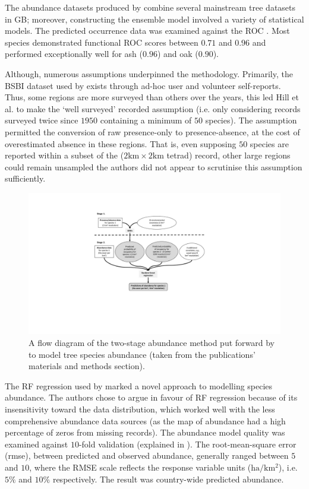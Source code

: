 The abundance datasets produced by \cite{hill.data} combine several mainstream tree datasets in GB; moreover, 
constructing the ensemble model involved a variety of statistical models.
The predicted occurrence data was examined against the ROC \cite{jimenez2012insights}.
Most species demonstrated functional ROC scores between $0.71$ and $0.96$ and performed exceptionally
well for ash ($0.96$) and oak ($0.90$).  

Although, numerous assumptions underpinned the methodology.
Primarily, the BSBI dataset used by \cite{hill.data} exists through ad-hoc user and volunteer self-reports.
Thus, some regions are more surveyed than others over the years, this led Hill et al. to make the 
`well surveyed' recorded assumption (i.e. only considering records surveyed twice since $1950$ containing a minimum of $50$ species).
The assumption permitted the conversion of raw presence-only to presence-absence, 
at the cost of overestimated absence in these regions. That is, even supposing $50$ species
are reported within a subset of the ($\mathrm{2km \times 2km}$ tetrad) record, other large regions could remain unsampled\textemdash
the authors did not appear to scrutinise this assumption sufficiently.

\begin{figure}
    \centering
    \includegraphics[scale=0.55]{chapter2/figures/hill-method-fig.pdf}
    \caption{A flow diagram of the two-stage abundance method put forward by \cite{hill.data} to model tree species abundance  
    (taken from the publications' materials and methods section).}
    \label{fig:hill-method}
\end{figure}

The RF regression used by \cite{hill.data} marked a novel approach to modelling species abundance.
The authors chose to argue in favour of RF regression because of its insensitivity toward the data distribution,
which worked well with the less comprehensive abundance data sources (as the map of abundance had a high percentage of zeros from missing records).
The abundance model quality was examined against $10$-fold validation (explained in \cite{refaeilzadeh2009cross}).
The root-mean-square error (\acrshort{rmse}), between predicted and observed abundance, generally ranged between $5$ and $10$,
where the RMSE scale reflects the response variable units ($\mathrm{ha/km^2}$), i.e. $5\%$ and $10\%$ respectively.
The result was country-wide predicted abundance.

